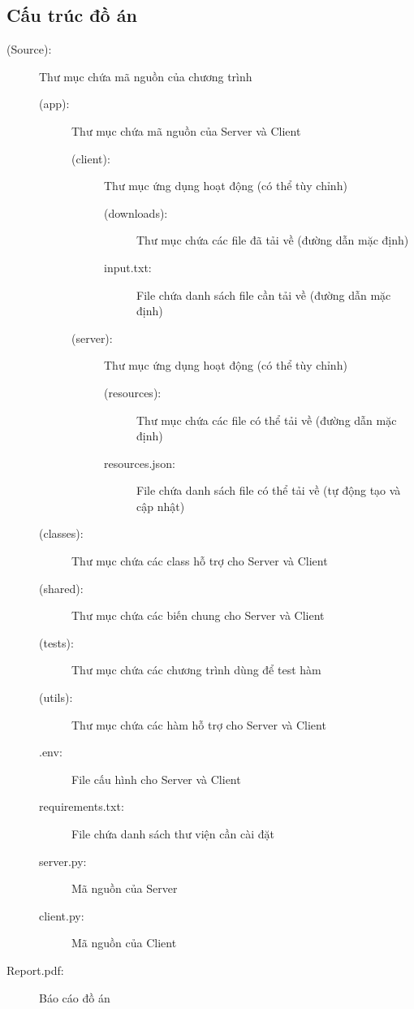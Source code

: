 \documentclass[a4paper,12pt]{report}
\begin{document}
\subsection{Cấu trúc đồ án}
\begin{flushleft}
  \begin{description}
    \item[(Source):]
          Thư mục chứa mã nguồn của chương trình\\
          \begin{description}
            \item[(app):]
                  Thư mục chứa mã nguồn của Server và Client
                  \begin{description}
                    \item[(client):]
                          Thư mục ứng dụng hoạt động (có thể tùy chỉnh)\\
                          \begin{description}
                            \item[(downloads):] Thư mục chứa các file đã tải về (đường dẫn mặc định)
                            \item[input.txt:] File chứa danh sách file cần tải về (đường dẫn mặc định)
                          \end{description}
                    \item[(server):]
                          Thư mục ứng dụng hoạt động (có thể tùy chỉnh)\\
                          \begin{description}
                            \item[(resources):] Thư mục chứa các file có thể tải về (đường dẫn mặc định)
                            \item[resources.json:] File chứa danh sách file có thể tải về (tự động tạo và cập nhật)
                          \end{description}
                  \end{description}
            \item[(classes):] Thư mục chứa các class hỗ trợ cho Server và Client
            \item[(shared):] Thư mục chứa các biến chung cho Server và Client
            \item[(tests):] Thư mục chứa các chương trình dùng để test hàm
            \item[(utils):] Thư mục chứa các hàm hỗ trợ cho Server và Client
            \item[.env:] File cấu hình cho Server và Client
            \item[requirements.txt:] File chứa danh sách thư viện cần cài đặt
            \item[server.py:] Mã nguồn của Server
            \item[client.py:] Mã nguồn của Client
          \end{description}
    \item[Report.pdf:] Báo cáo đồ án
  \end{description}
\end{flushleft}
\end{document}
